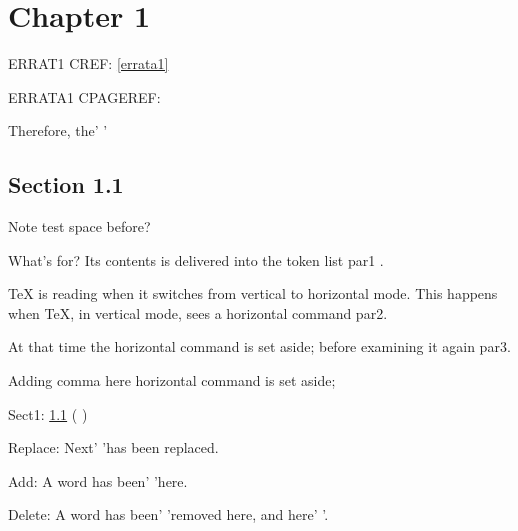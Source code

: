 \documentclass[a4paper,12pt]{report}
\makeatletter
\newcommand{\getCurrentSectionNumber}{%
  \ifnum\c@section=0 %
  \thechapter
  \else
  \ifnum\c@subsection=0 %
  \thesection
  \else
  \ifnum\c@subsubsection=0 %
  \thesubsection
  \else
  \thesubsubsection
  \fi
  \fi
  \fi
}
\makeatother
\begin{document}
\chapter{Chapter 1}\label{chap-one}

\immediate{}%





ERRAT1 CREF: \cref{errata1}

ERRATA1 CPAGEREF: 


Therefore, the'
'

\section{Section 1.1}\label{sect-one}

Note test  space before?



What's for? Its contents is delivered into the token list par1 .

TeX is reading when it switches from vertical to horizontal mode.  This happens when TeX, in vertical mode, sees a horizontal command par2.

At that time the horizontal command is set aside;  before examining it again par3.



Adding comma here\erratumAdd{,} horizontal command is set aside;

Sect1: \cref{sect-one}  (\getCurrentSectionNumber)

Replace: Next'  'has been replaced.





Add: A word has been'  'here.


Delete: A word has been'  'removed here, and here' '.

\end{document}
